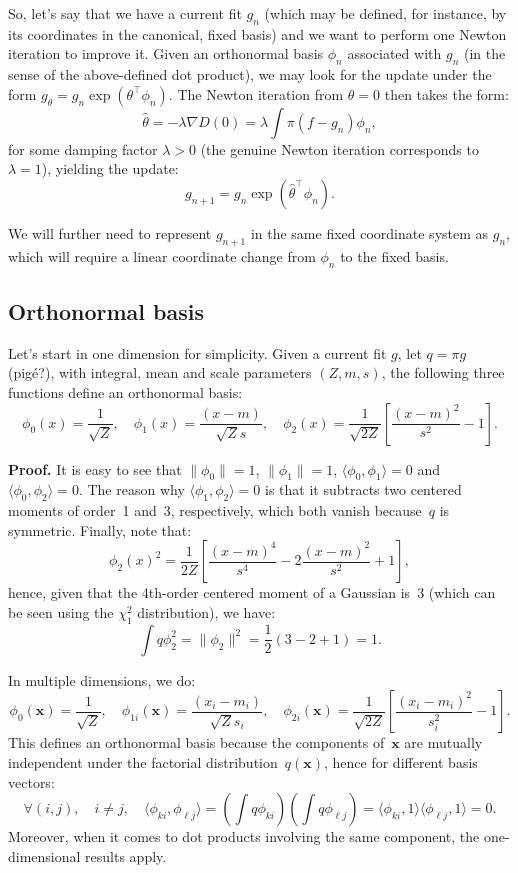 \documentclass{article}
\def\x{\mathbf{x}}
\begin{document}
So, let's say that we have a current fit $g_n$ (which may be defined, for instance, by its coordinates in the canonical, fixed basis) and we want to perform one Newton iteration to improve it. Given an orthonormal basis $\phi_n$ associated with $g_n$ (in the sense of the above-defined dot product), we may look for the update under the form $g_\theta = g_n \exp({\theta^\top \phi_n})$. The Newton iteration from $\theta=0$ then takes the form:
$$
\hat{\theta} = -\lambda \nabla D(0) = \lambda \int \pi(f - g_n)\phi_n,
$$
for some damping factor $\lambda > 0$ (the genuine Newton iteration corresponds to $\lambda=1$), yielding the update:
$$
g_{n+1} = g_n \exp (\hat{\theta}^\top \phi_n).
$$

We will further need to represent $g_{n+1}$ in the same fixed coordinate system as $g_n$, which will require a linear coordinate change from $\phi_n$ to the fixed basis. 



\subsection{Orthonormal basis}

Let's start in one dimension for simplicity. Given a current fit $g$, let $q=\pi g$ (pig\'e?),  with integral, mean and scale parameters $(Z, m, s)$, the following three functions define an orthonormal basis:
$$
\phi_0(x) = \frac{1}{\sqrt{Z}},
\quad \phi_1(x) = \frac{(x-m)}{\sqrt{Z}s},
\quad \phi_2(x) = \frac{1}{\sqrt{2Z}}\left[\frac{(x-m)^2}{s^2} - 1\right].
$$

{\bf Proof.} It is easy to see that $\|\phi_0\|=1$, $\|\phi_1\|=1$, $\langle \phi_0, \phi_1 \rangle=0$ and $\langle \phi_0, \phi_2 \rangle=0$. The reason why $\langle \phi_1, \phi_2 \rangle=0$ is that it subtracts two centered moments of order~1 and~3, respectively, which both vanish because~$q$ is symmetric. Finally, note that:
$$
\phi_2(x)^2 = \frac{1}{2Z} 
\left[\frac{(x-m)^4}{s^4} - 2 \frac{(x-m)^2}{s^2} + 1 \right],
$$
hence, given that the 4th-order centered moment of a Gaussian is~3 (which can be seen using the $\chi_1^2$ distribution), we have:
$$
\int q \phi_2^2 = \|\phi_2\|^2 = \frac{1}{2} (3 - 2 + 1) = 1.
$$

In multiple dimensions, we do:
$$
\phi_0(\x) = \frac{1}{\sqrt{Z}}, 
\quad
\phi_{1i}(\x) = \frac{(x_i-m_i)}{\sqrt{Z} s_i},
\quad
\phi_{2i}(\x) = \frac{1}{\sqrt{2Z}}\left[\frac{(x_i-m_i)^2}{s_i^2} - 1\right].
$$
This defines an orthonormal basis because the components of~$\x$ are mutually independent under the factorial distribution~$q(\x)$, hence for different basis vectors: 
$$
\forall (i,j), \quad i\not= j, \quad
\langle \phi_{ki}, \phi_{\ell j} \rangle
= \left(\int q \phi_{ki}\right)\left(\int q \phi_{\ell j}\right)
= \langle \phi_{ki}, 1 \rangle \langle \phi_{\ell j}, 1 \rangle = 0.
$$
Moreover, when it comes to dot products involving the same component, the one-dimensional results apply.
\end{document}
